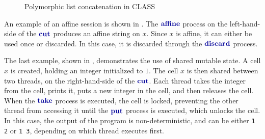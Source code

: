 \begin{figure}
    \centering
    \begin{minipage}[b]{0.6\textwidth}
    \begin{class}
    \end{class}
    \end{minipage}
    \hfill
    \begin{minipage}[b]{0.3\textwidth}
    \begin{class}
    \end{class}
    \end{minipage}
    \caption{Polymorphic list concatenation in CLASS}
    \label{fig:CLASSPolymorphismExample}
\end{figure}

An example of an affine session is shown in . The $\affinep$ process on the left-hand-side of the $\cutp$ produces an affine string on $x$. Since $x$ is affine, it can either be used once or discarded. In this case, it is discarded through the $\discardp$ process.

The last example, shown in , demonstrates the use of shared mutable state. A cell $x$ is created, holding an integer initialized to $1$. The cell $x$ is then shared between two threads, on the right-hand-side of the $\cutp$. Each thread takes the integer from the cell, prints it, puts a new integer in the cell, and then releases the cell. When the $\takep$ process is executed, the cell is locked, preventing the other thread from accessing it until the $\putp$ process is executed, which unlocks the cell. In this case, the output of the program is non-deterministic, and can be either \texttt{1 2} or \texttt{1 3}, depending on which thread executes first.

